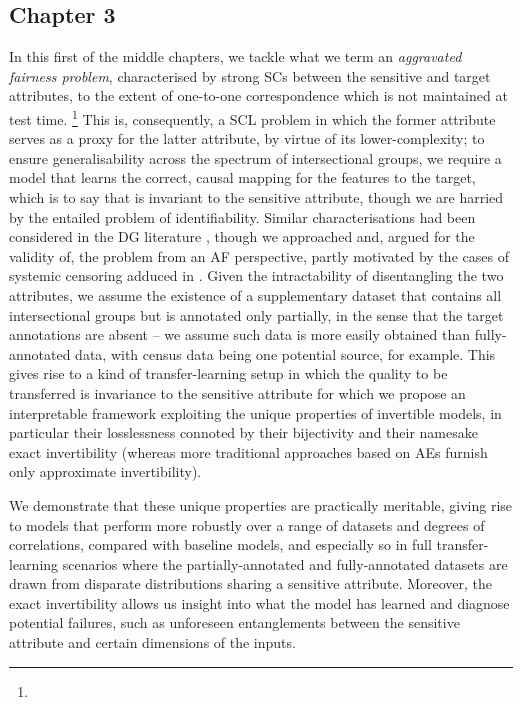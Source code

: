 \subsection*{Chapter 3}%
%
In this first of the middle chapters, we tackle what we term an \emph{aggravated fairness problem},
characterised by strong \acp{SC} between the sensitive and target attributes, to the extent of
one-to-one correspondence which is not maintained at test time.
\footnote{
}
%
This is, consequently, a \ac{SCL} problem in which the former attribute serves as a proxy
for the latter attribute, by virtue of its lower-complexity; to ensure generalisability across the
spectrum of intersectional groups, we require a model that learns the correct, causal mapping for
the features to the target, which is to say that is invariant to the sensitive attribute, though we
are harried by the entailed problem of identifiability.
%
Similar characterisations had been considered in the \ac{DG} literature
\citep{arjovsky2019invariant, jacobsen2019excessive}, though we approached and, argued for the
validity of, the problem from an \ac{AF} perspective, partly motivated by the cases of systemic
censoring adduced in \citet{kallus2018residual}.
%
Given the intractability of disentangling the two attributes, we assume the existence of a
supplementary dataset that contains all intersectional groups but is annotated only partially, in
the sense that the target annotations are absent -- we assume such data is more easily obtained
than fully-annotated data, with census data being one potential source, for example.
%
This gives rise to a kind of transfer-learning setup in which the quality to be transferred is
invariance to the sensitive attribute for which we propose an interpretable framework exploiting
the unique properties of invertible models, in particular their losslessness connoted by their
bijectivity and their namesake exact invertibility (whereas more traditional approaches based on
\acp{AE} furnish only approximate invertibility).
%

We demonstrate that these unique properties are practically meritable, giving rise to models that
perform more robustly over a range of datasets and degrees of correlations, compared with baseline
models, and especially so in full transfer-learning scenarios where the partially-annotated and
fully-annotated datasets are drawn from disparate distributions sharing a sensitive attribute.
%
Moreover, the exact invertibility allows us insight into what the model has learned and diagnose
potential failures, such as unforeseen entanglements between the sensitive attribute and certain
dimensions of the inputs.
%
